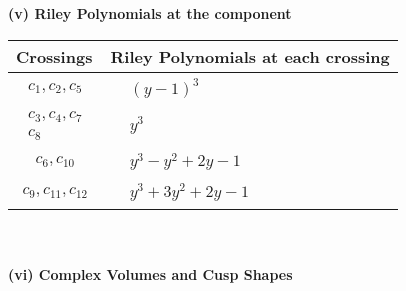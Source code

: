 \documentclass[1p]{elsarticle_modified}
\theoremstyle{definition}
\begin{document}
\newpage\renewcommand{\arraystretch}{1}
\flushleft \textbf{(v) Riley Polynomials at the component}\newline \\
\begin{tabular}{m{50pt}|m{274pt}}
Crossings & \hspace{64pt}Riley Polynomials at each crossing \\
\hline $$\begin{aligned}c_{1},c_{2},c_{5}\end{aligned}$$&$\begin{aligned}
&(y-1)^3
\end{aligned}$\\
\hline $$\begin{aligned}c_{3},c_{4},c_{7}\\c_{8}\end{aligned}$$&$\begin{aligned}
&y^3
\end{aligned}$\\
\hline $$\begin{aligned}c_{6},c_{10}\end{aligned}$$&$\begin{aligned}
&y^3- y^2+2 y-1
\end{aligned}$\\
\hline $$\begin{aligned}c_{9},c_{11},c_{12}\end{aligned}$$&$\begin{aligned}
&y^3+3 y^2+2 y-1
\end{aligned}$\\
\hline
\end{tabular}\\~\\
\newpage\flushleft \textbf{(vi) Complex Volumes and Cusp Shapes}
\end{document}
